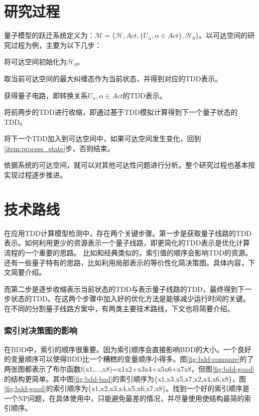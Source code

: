 \section{研究过程}
量子模型的跃迁系统定义为：$\mathcal{M}=\{\mathcal{H},Act,\{U_\alpha,\alpha\in Act\},\mathcal{H}_0\}$。以可达空间的研究过程为例，主要为以下几步：
\begin{myen}
	\item \label{item:process_inital}将可达空间初始化为$\mathcal{H}_0$。
	\item \label{item:process_state}取当前可达空间的最大纠缠态作为当前状态，并得到对应的TDD表示。
	\item \label{item:process_cir}获得量子电路，即转换关系$U_\alpha,\alpha\in Act$的TDD表示。
	\item \label{item:process_cont} 将前两步的TDD进行收缩，即通过基于TDD模拟计算得到下一个量子状态的TDD。
	\item \label{item:process_end}将下一个TDD加入到可达空间中，如果可达空间发生变化，回到\ref{item:process_state}步，否则结束。
\end{myen}
	
依据系统的可达空间，就可以对其他可达性问题进行分析。整个研究过程也基本按实现过程逐步推进。
\section{技术路线}
在应用TDD计算模型检测中，存在两个关键步骤。第一步是获取量子线路的TDD表示。如何利用更少的资源表示一个量子线路，即更简化的TDD表示是优化计算流程的一个重要的思路。
比如和经典类似的，索引值的顺序会影响TDD的资源。还有一些量子特有的思路，比如利用局部表示的等价性化简决策图。具体内容，下文简要介绍。

而第二步是逐步收缩表示当前状态的TDD与表示量子线路的TDD，最终得到下一步状态的TDD。在这两个步骤中加入好的优化方法是能够减少运行时间的关键。在不同的分割量子线路方案中，有两类主要技术路线，下文也将简要介绍。
\subsubsection{索引对决策图的影响}

在BDD中，索引的顺序很重要。因为索引顺序会直接影响BDD的大小。一个良好的变量顺序可以使得BDD比一个糟糕的变量顺序小得多。图\ref{fig:bdd-compare}的了两张图都表示了布尔函数ƒ(x1,...,x8)=x1x2+x3x4+x5x6+x7x8，但图\ref{fig:bdd-good}的结构更简单。其中图\ref{fig:bdd-bad}的索引顺序为\{x1,x3,x5,x7,x2,x4,x6,x8\}，图\ref{fig:bdd-good}的索引顺序为\{x1,x2,x3,x4,x5,x6,x7,x8\}。找到一个好的索引顺序是一个NP问题，在具体使用中，只能避免最差的情况，并尽量使用使结构最简的索引顺序。

